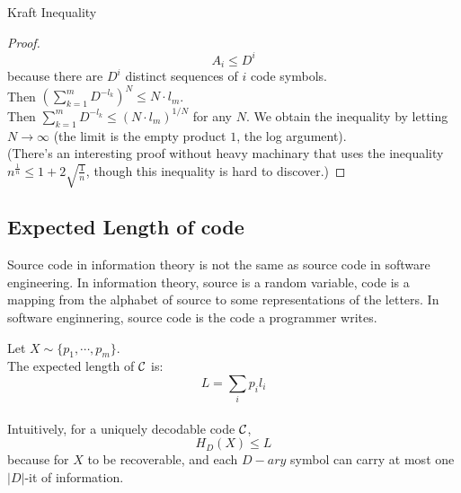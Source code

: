 \documentclass[../main.tex]{subfiles}
\begin{document}
\begin{bbox}{Kraft Inequality}
\begin{proof}
\begin{equation*}
        A_i\leq D^{i}
    \end{equation*}
    because there are $D^i$ distinct sequences of $i$ code symbols.\\
    Then $(\sum_{k=1}^{m}D^{-l_k})^N\leq N\cdot l_m$.\\
    Then $\sum_{k=1}^{m}D^{-l_k}\leq (N\cdot l_m)^{1/N}$ for any $N$. We obtain the inequality by letting $N\to \infty$ (the limit is the empty product $1$, the log argument).\\
    (There's an interesting proof without heavy machinary that uses the inequality $n^{\frac{1}{n}}\leq 1+2\sqrt{\frac{1}{n}}$, though this inequality is hard to discover.)
\end{proof}
\end{bbox}

\subsection{Expected Length of code}
    \begin{remark}
        Source code in information theory is not the same as source code in software engineering. In information theory, source is a random variable, code is a mapping from the alphabet of source to some representations of the letters. In software enginnering, source code is the code a programmer writes.
    \end{remark}
    Let $X\sim \{p_1,\cdots,p_m\}$.\\
    The expected length of $\mathcal{C}$ is: \begin{equation*}
        L=\sum_{i}p_il_i
    \end{equation*}\\
    Intuitively, for a uniquely decodable code $\mathcal{C}$, \begin{equation*}
        H_D(X)\leq L
    \end{equation*} because for $X$ to be recoverable, and each $D-ary$ symbol can carry at most one $|D|$-it of information.
\end{document}
